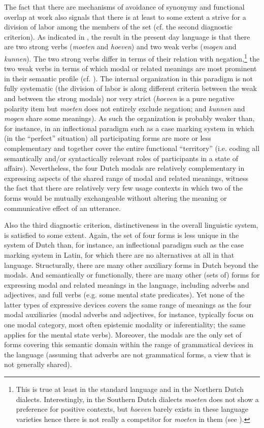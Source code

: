 \documentclass[output=paper]{langsci/langscibook}
\begin{document}
The fact that there are mechanisms of avoidance of synonymy and functional overlap at work also signals that there is at least to some extent a strive for a division of labor among the members of the set (cf. the second diagnostic criterion). As indicated in , the result in the present day language is that there are two strong verbs (\textit{moeten} and \textit{hoeven}) and two weak verbs (\textit{mogen} and \textit{kunnen}). The two strong verbs differ in terms of their relation with negation,\footnote{This is true at least in the standard language and in the Northern Dutch dialects. Interestingly, in the Southern Dutch dialects \textit{moeten} does not show a preference for positive contexts, but \textit{hoeven} barely exists in these language varieties hence there is not really a competitor for \textit{moeten} in them (see \citealt{DiepeveenDiepeveen2006}).} the two weak verbs in terms of which modal or related meanings are most prominent in their semantic profile (cf. ). The internal organization in this paradigm is not fully systematic (the division of labor is along different criteria between the weak and between the strong modals) nor very strict (\textit{hoeven} is a pure negative polarity item but \textit{moeten} does not entirely exclude negation; and \textit{kunnen} and \textit{mogen} share some meanings). As such the organization is probably weaker than, for instance, in an inflectional paradigm such as a case marking system in which (in the “perfect” situation) all participating forms are more or less complementary and together cover the entire functional “territory” (i.e. coding all semantically and/or syntactically relevant roles of participants in a state of affairs). Nevertheless, the four Dutch modals are relatively complementary in expressing aspects of the shared range of modal and related meanings, witness the fact that there are relatively very few usage contexts in which two of the forms would be mutually exchangeable without altering the meaning or communicative effect of an utterance.

Also the third diagnostic criterion, distinctiveness in the overall linguistic system, is satisfied to some extent. Again, the set of four forms is less unique in the system of Dutch than, for instance, an inflectional paradigm such as the case marking system in Latin, for which there are no alternatives at all in that language. Structurally, there are many other auxiliary forms in Dutch beyond the modals. And semantically or functionally, there are many other (sets of) forms for expressing modal and related meanings in the language, including adverbs and adjectives, and full verbs (e.g. some mental state predicates). Yet none of the latter types of expressive devices covers the same range of meanings as the four modal auxiliaries (modal adverbs and adjectives, for instance, typically focus on one modal category, most often epistemic modality or inferentiality; the same applies for the mental state verbs). Moreover, the modals are the only set of forms covering this semantic domain within the range of grammatical devices in the language (assuming that adverbs are not grammatical forms, a view that is not generally shared).
\end{document}

